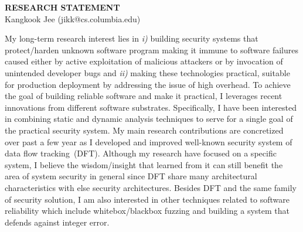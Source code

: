 \documentclass[letterpaper, 10pt]{article}
\begin{document}
\begin{small}

\begin{center}
{\LARGE \bf RESEARCH STATEMENT}\\
\vspace*{0.1cm}
{\normalsize Kangkook Jee (jikk@cs.columbia.edu)}
\end{center}



My long-term research interest lies in {\it i)} building security systems that
protect/harden unknown software program making it immune to software failures
caused either by active exploitation of malicious attackers or by invocation of
unintended developer bugs and {\it ii)} making these technologies practical,
suitable for production deployment by addressing the issue of high overhead.
%
To achieve the goal of building reliable software and make it practical, I
leverages recent innovations from different software substrates. Specifically,
I have been interested in combining static and dynamic analysis techniques to
serve for a single goal of the practical security system. 
%
My main research contributions are concretized over past a few year as I
developed and improved well-known security system of data flow tracking~(DFT).
Although my research have focused on a specific system, I believe the
wisdom/insight that learned from it can still benefit the area of system
security in general since DFT share many architectural characteristics with
else security architectures.  
%
Besides DFT and the same family of security solution, I am also interested in
other techniques related to software reliability which include
whitebox/blackbox fuzzing and building a system that defends against integer
error. 


\end{small}
\end{document}
